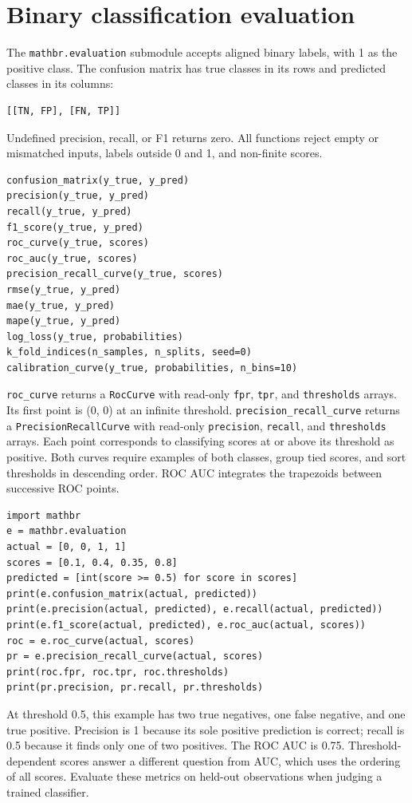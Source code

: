 \documentclass[11pt,a4paper]{article}
\begin{document}
\section{Binary classification evaluation}
The \verb|mathbr.evaluation| submodule accepts aligned binary labels, with 1 as the positive class. The confusion matrix has true classes in its rows and predicted classes in its columns:
\begin{verbatim}
[[TN, FP], [FN, TP]]
\end{verbatim}
Undefined precision, recall, or F1 returns zero. All functions reject empty or mismatched inputs, labels outside 0 and 1, and non-finite scores.
\begin{verbatim}
confusion_matrix(y_true, y_pred)
precision(y_true, y_pred)
recall(y_true, y_pred)
f1_score(y_true, y_pred)
roc_curve(y_true, scores)
roc_auc(y_true, scores)
precision_recall_curve(y_true, scores)
rmse(y_true, y_pred)
mae(y_true, y_pred)
mape(y_true, y_pred)
log_loss(y_true, probabilities)
k_fold_indices(n_samples, n_splits, seed=0)
calibration_curve(y_true, probabilities, n_bins=10)
\end{verbatim}
\verb|roc_curve| returns a \verb|RocCurve| with read-only \verb|fpr|, \verb|tpr|, and \verb|thresholds| arrays. Its first point is (0, 0) at an infinite threshold. \verb|precision_recall_curve| returns a \verb|PrecisionRecallCurve| with read-only \verb|precision|, \verb|recall|, and \verb|thresholds| arrays. Each point corresponds to classifying scores at or above its threshold as positive. Both curves require examples of both classes, group tied scores, and sort thresholds in descending order. ROC AUC integrates the trapezoids between successive ROC points.
\begin{verbatim}
import mathbr
e = mathbr.evaluation
actual = [0, 0, 1, 1]
scores = [0.1, 0.4, 0.35, 0.8]
predicted = [int(score >= 0.5) for score in scores]
print(e.confusion_matrix(actual, predicted))
print(e.precision(actual, predicted), e.recall(actual, predicted))
print(e.f1_score(actual, predicted), e.roc_auc(actual, scores))
roc = e.roc_curve(actual, scores)
pr = e.precision_recall_curve(actual, scores)
print(roc.fpr, roc.tpr, roc.thresholds)
print(pr.precision, pr.recall, pr.thresholds)
\end{verbatim}
At threshold 0.5, this example has two true negatives, one false negative, and one true positive. Precision is 1 because its sole positive prediction is correct; recall is 0.5 because it finds only one of two positives. The ROC AUC is 0.75. Threshold-dependent scores answer a different question from AUC, which uses the ordering of all scores. Evaluate these metrics on held-out observations when judging a trained classifier.
\end{document}
